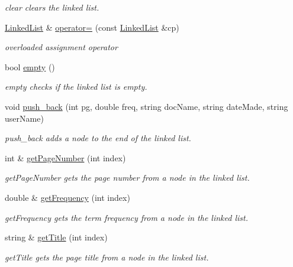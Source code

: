 \begin{DoxyCompactItemize}
\begin{DoxyCompactList}\small\item\em clear clears the linked list. \end{DoxyCompactList}\item 
\hyperlink{class_linked_list}{Linked\-List} \& \hyperlink{class_linked_list_a522a87f8da5057b0e0bb4565bb348ec3}{operator=} (const \hyperlink{class_linked_list}{Linked\-List} \&cp)
\begin{DoxyCompactList}\small\item\em overloaded assignment operator \end{DoxyCompactList}\item 
bool \hyperlink{class_linked_list_a22987b83cc33313bb594a2d67aa9f289}{empty} ()
\begin{DoxyCompactList}\small\item\em empty checks if the linked list is empty. \end{DoxyCompactList}\item 
void \hyperlink{class_linked_list_abf524a3e1cd90e8374fa5c24f64dfd18}{push\-\_\-back} (int pg, double freq, string doc\-Name, string date\-Made, string user\-Name)
\begin{DoxyCompactList}\small\item\em push\-\_\-back adds a node to the end of the linked list. \end{DoxyCompactList}\item 
int \& \hyperlink{class_linked_list_a0428164a801662e4908f87ce826cedbf}{get\-Page\-Number} (int index)
\begin{DoxyCompactList}\small\item\em get\-Page\-Number gets the page number from a node in the linked list. \end{DoxyCompactList}\item 
double \& \hyperlink{class_linked_list_a36b29b42c7e4316a4a1663cbc60804a7}{get\-Frequency} (int index)
\begin{DoxyCompactList}\small\item\em get\-Frequency gets the term frequency from a node in the linked list. \end{DoxyCompactList}\item 
string \& \hyperlink{class_linked_list_ab1605d5e12f51dd7f00d042415b80232}{get\-Title} (int index)
\begin{DoxyCompactList}\small\item\em get\-Title gets the page title from a node in the linked list. \end{DoxyCompactList}\item 

\end{DoxyCompactItemize}
